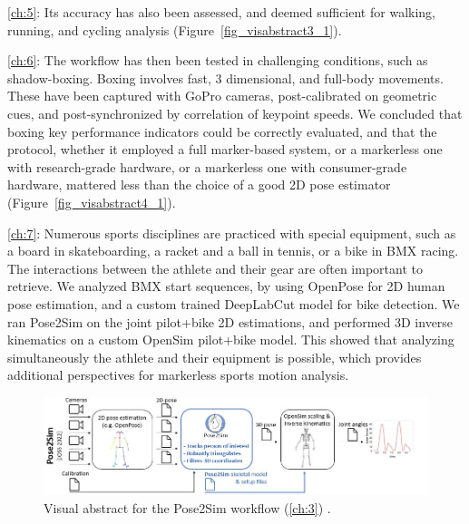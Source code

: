 \noindent\autoref{ch:5}: Its accuracy has also been assessed, and deemed sufficient for walking, running, and cycling analysis \cite{Pagnon2022a} (Figure~\ref{fig_visabstract3_1}). 

\noindent\autoref{ch:6}: The workflow has then been tested in challenging conditions, such as shadow-boxing. Boxing involves fast, 3 dimensional, and full-body movements. These have been captured with GoPro cameras, post-calibrated on geometric cues, and post-synchronized by correlation of keypoint speeds. We concluded that boxing key performance indicators could be correctly evaluated, and that the protocol, whether it employed a full marker-based system, or a markerless one with research-grade hardware, or a markerless one with consumer-grade hardware, mattered less than the choice of a good 2D pose estimator \cite{Pagnon2022c} (Figure~\ref{fig_visabstract4_1}).  

\noindent\autoref{ch:7}: Numerous sports disciplines are practiced with special equipment, such as a board in skateboarding, a racket and a ball in tennis, or a bike in BMX racing. The interactions between the athlete and their gear are often important to retrieve. We analyzed BMX start sequences, by using OpenPose for 2D human pose estimation, and a custom trained DeepLabCut model for bike detection. We ran Pose2Sim on the joint {pilot+bike} 2D estimations, and performed 3D inverse kinematics on a custom OpenSim {pilot+bike} model. This showed that analyzing simultaneously the athlete and their equipment is possible, which provides additional perspectives for markerless sports motion analysis. 

\begin{figure}[hbtp]
	\centering
            \def\svgwidth{1\columnwidth}
            \fontsize{10pt}{10pt}\selectfont
            \includegraphics[width=\linewidth]{"../Intro/Figures/Fig_VisAbstract1.JPG"}
            \caption{Visual abstract for the Pose2Sim workflow (\autoref{ch:3}) \cite{Pagnon2022b}.}
            \label{fig_visabstract1_1}
\end{figure}


